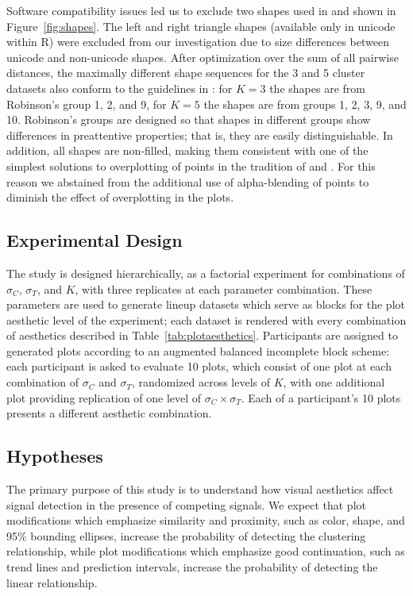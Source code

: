 \documentclass[12pt]{article}\usepackage[]{graphicx}\usepackage[]{color}
\begin{document}
Software compatibility issues led us to exclude two shapes used in \citet{heer:2014} and shown in Figure~\ref{fig:shapes}. The left and right triangle shapes (available only in unicode within R) were excluded from our investigation due to size differences between unicode and non-unicode shapes. After optimization over the sum of all pairwise distances, the maximally different shape sequences for the 3 and 5 cluster datasets also conform to the guidelines in \citet{robinson:03}: for $K=3$ the shapes are from Robinson's group 1, 2, and 9, for $K=5$ the shapes are from groups 1, 2, 3, 9, and 10. Robinson's groups are designed so that shapes in different groups show differences in preattentive properties; that is, they are easily distinguishable. In addition, all shapes are non-filled, making them consistent with one of the simplest solutions to overplotting of points in the tradition of \citet{tukey, cleveland:85} and \citet{few}. For this reason we abstained from the additional use of alpha-blending of points to diminish the effect of overplotting in the plots.

\subsection{Experimental Design}
The study is designed hierarchically, as a factorial experiment for combinations of $\sigma_C$, $\sigma_T$, and $K$, with three replicates at each parameter combination. These parameters are used to generate lineup datasets which serve as blocks for the plot aesthetic level of the experiment; each dataset is rendered with every combination of aesthetics described in Table~\ref{tab:plotaesthetics}. Participants are assigned to generated plots according to an augmented balanced incomplete block scheme: each participant is asked to evaluate 10 plots, which consist of one plot at each combination of $\sigma_C$ and $\sigma_T$, randomized across levels of $K$, with one additional plot providing replication of one level of $\sigma_C\times\sigma_T$. Each of a participant's 10 plots presents a different aesthetic combination.

\subsection{Hypotheses}
The primary purpose of this study is to understand how visual aesthetics affect signal detection in the presence of competing signals. We expect that plot modifications which emphasize similarity and proximity, such as color, shape, and 95\% bounding ellipses,  increase the probability of detecting the clustering relationship, while plot modifications which emphasize good continuation, such as trend lines and prediction intervals, increase the probability of detecting the linear relationship. 
\end{document}
